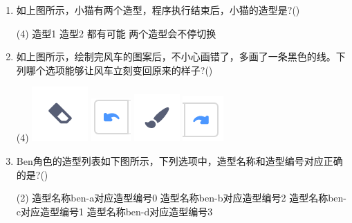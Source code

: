 \documentclass[10pt, a4paper]{article}
\begin{document}
\begin{enumerate}
        \item 如上图所示，小猫有两个造型，程序执行结束后，小猫的造型是?(\qquad)
        \begin{tasks}(4)
            \task 造型1
            \task 造型2
            \task 都有可能
            \task 两个造型会不停切换
        \end{tasks}

        \item 如上图所示，绘制完风车的图案后，不小心画错了，多画了一条黑色的线。下列哪个选项能够让风车立刻变回原来的样子?(\qquad)
        \begin{tasks}(4)
            \task \includegraphics[width=.04\textwidth]{6a.png}
            \task \includegraphics[width=.04\textwidth]{6b.png}
            \task \includegraphics[width=.04\textwidth]{6c.png}
            \task \includegraphics[width=.04\textwidth]{6d.png}
        \end{tasks}

        \newpage
        \item Ben角色的造型列表如下图所示，下列选项中，造型名称和造型编号对应正确的是?(\qquad)
        \begin{tasks}(2)
            \task 造型名称ben-a对应造型编号0
            \task 造型名称ben-b对应造型编号2
            \task 造型名称ben-c对应造型编号1
            \task 造型名称ben-d对应造型编号3
        \end{tasks}


\end{enumerate}
\end{document}
